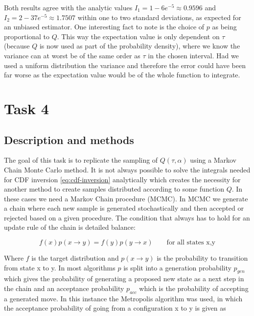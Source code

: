 \documentclass[a4paper, 11pt]{article}          %
\begin{document}
    Both results agree with the analytic values $I_1 = 1-6e^{-5} \approx 0.9596$ and $I_2 = 2-37e^{-5} \approx 1.7507$ within one to two standard deviations, as expected for an unbiased estimator. One interesting fact to note is the choice of $p$ as being proportional to $Q$. This way the expectation value is only dependent on $\tau$ (because $Q$ is now used as part of the probability density), where we know the variance can at worst be of the same order as $\tau$ in the chosen interval. Had we used a uniform distribution the variance and therefore the error could have been far worse as the expectation value would be of the whole function to integrate.

    \section{Task 4}\label{sec:task4}

    \subsection{Description and methods}

    The goal of this task is to replicate the sampling of $Q(\tau, \alpha)$ using a Markov Chain Monte Carlo method. It is not always possible to solve the integrals needed for CDF inversion \eqref{eq:cdf-inversion} analytically which creates the necessity for another method to create samples distributed according to some function $Q$. In these cases we need a Markov Chain procedure (MCMC). In MCMC we generate a chain where each new sample is generated stochastically and then accepted or rejected based on a given procedure. The condition that always has to hold for an update rule of the chain is detailed balance\cite{advanced_comp_physics_script}:
    
    \begin{equation}\label{eq:detailled_balance}
        f(x)p(x \rightarrow y) = f(y)p(y \rightarrow x) \qquad \text{for all states x,y}
    \end{equation}

    Where $f$ is the target distribution and $p(x \rightarrow y)$ is the probability to transition from state x to y. In most algorithms $p$ is split into a generation probability $p_{gen}$ which gives the probability of generating a proposed new state as a next step in the chain and an acceptance probability $p_{acc}$ which is the probability of accepting a generated move. In this instance the Metropolis algorithm was used, in which the acceptance probability of going from a configuration x to y is given as
\end{document}
